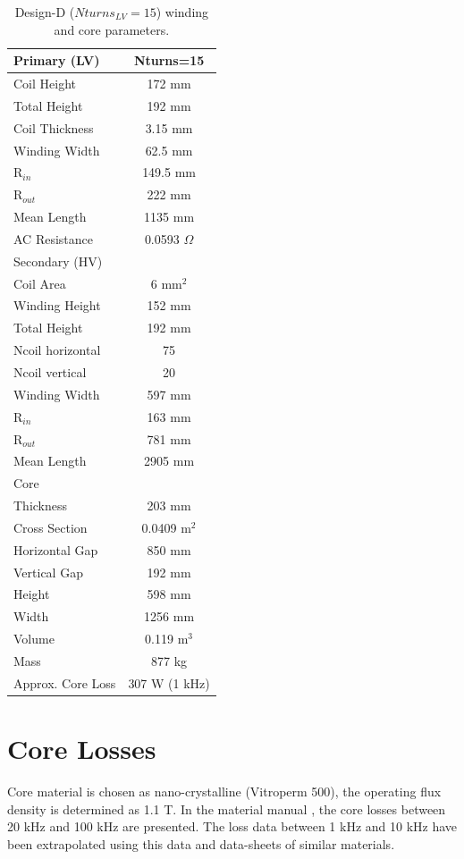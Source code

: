 \documentclass[a4paper, 11pt]{article} %
\begin{document}
\begin{table}[]
\begin{center}
\begin{tabular}{lc}
Primary (LV) & Nturns=15\\
\hline
Coil Height & 172 mm \\
Total Height & 192 mm \\
Coil Thickness & 3.15 mm\\
Winding Width & 62.5 mm \\
R$_{in}$ & 149.5 mm \\
R$_{out}$ & 222 mm \\
Mean Length & 1135 mm \\
AC Resistance & 0.0593 $\Omega$ \\
\hline
Secondary (HV) \\
Coil Area & 6 mm$^2$\\
Winding Height & 152 mm \\ 
Total Height & 192 mm \\
Ncoil horizontal & 75 \\
Ncoil vertical & 20 \\
Winding Width & 597 mm \\
R$_{in}$ & 163 mm \\
R$_{out}$ & 781 mm \\
Mean Length & 2905 mm \\
\hline
Core \\
Thickness & 203 mm \\
Cross Section & 0.0409 m$^2$\\
Horizontal Gap & 850 mm \\
Vertical Gap & 192 mm \\
Height & 598 mm \\
Width & 1256 mm \\
Volume & 0.119 m$^3$ \\
Mass & 877 kg \\
\hline
Approx. Core Loss & 307 W (1 kHz) \\
\hline
\end{tabular} 
\end{center}
\caption{Design-D ($Nturns_{LV}=15$) winding and core parameters.}
\label{design_D}
\end{table}

\clearpage

\section{Core Losses}
Core material is chosen as nano-crystalline (Vitroperm 500), the operating flux density is determined as 1.1 T.  In the material manual \cite{Vacuumschmelze2003}, the core losses between 20 kHz and 100 kHz are presented. The loss data between 1 kHz  and 10 kHz have been extrapolated using this data and data-sheets of similar materials.  
\end{document}
